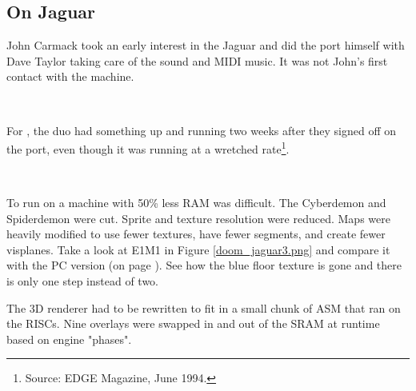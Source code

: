 \subsection{\doom{} On Jaguar}
John Carmack took an early interest in the Jaguar and did the port himself with Dave Taylor taking care of the sound and MIDI music. It was not John's first contact with the machine.\\
\par
{}\\
\par
For \doom, the duo had something up and running two weeks after they signed off on the port, even though it was running at a wretched rate\footnote{Source: EDGE Magazine, June 1994.}.\\
\par
{}\\
\par
To run on a machine with 50\% less RAM was difficult. The Cyberdemon and Spiderdemon were cut. Sprite and texture resolution were reduced. Maps were heavily modified to use fewer textures, have fewer segments, and create fewer visplanes. Take a look at E1M1 in Figure \ref{doom_jaguar3.png} and compare it with the PC version (on page \pageref{mashed_potatoes1.png}). See how the blue floor texture is gone and there is only one step instead of two.\\
\par
The 3D renderer had to be rewritten to fit in a small chunk of ASM that ran on the RISCs. Nine overlays were swapped in and out of the SRAM at runtime based on engine "phases".\\
\par
{}
\par
